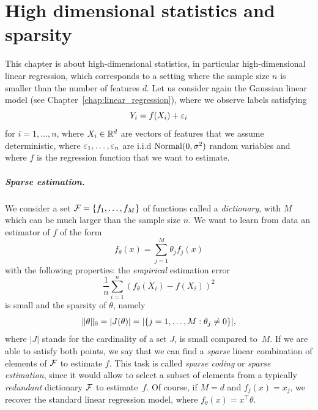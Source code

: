 \setchapterpreamble[u]{\margintoc}
\chapter{High dimensional statistics and sparsity}
\label{chap:high_dimensional_statistics}

This chapter is about high-dimensional statistics, in particular high-dimensional linear regression, which corresponds to a setting where the sample size $n$ is smaller than the number of features $d$.
Let us consider again the Gaussian linear model (see Chapter~\ref{chap:linear_regression}), where we observe labels satisfying
\begin{equation*}
	Y_i = f(X_i) + \varepsilon_i
\end{equation*}
for $i=1, \ldots, n$, where $X_i \in \mathbb R^d$ are vectors of features that we assume deterministic, where $\varepsilon_1, \ldots, \varepsilon_n$ are i.i.d $\operatorname{Normal}(0, \sigma^2)$ random variables and where $f$ is the regression function that we want to estimate.


\paragraph{Sparse estimation.}

We consider a set $\operatorname{{\mathcal F}} = \{ f_1, \ldots, f_M \}$ of functions called a \emph{dictionary}, with $M$ which can be much larger than the sample size $n$.  
We want to learn from data an estimator of $f$ of the form
\begin{equation*}
	f_\theta(x) = \sum_{j=1}^M \theta_j f_j(x)
\end{equation*}
with the following properties: the \emph{empirical} estimation error
\begin{equation*}
	\frac 1n \sum_{i=1}^n (f_\theta(X_i) - f(X_i))^2
\end{equation*}
is small and the sparsity of $\theta$, namely
\begin{equation}
	\label{eq:sparsity}
	\| \theta \|_0 = |J(\theta)| = | \{ j=1, \ldots, M : \theta_j \neq 0\} |,
\end{equation}
where $|J|$ stands for the cardinality of a set $J$, is small compared to~$M$.
If we are able to satisfy both points, we say that we can find a \emph{sparse} linear combination of elements of $\operatorname{{\mathcal F}}$ to estimate $f$.
This task is called \emph{sparse coding} or \emph{sparse estimation}, since it would allow to select a subset of elements from a typically \emph{redundant} dictionary $\operatorname{{\mathcal F}}$ to estimate~$f$.
Of course, if $M = d$ and $f_j(x) = x_j$, we recover the standard linear regression model, where $f_\theta(x) = x^\top \theta$.

